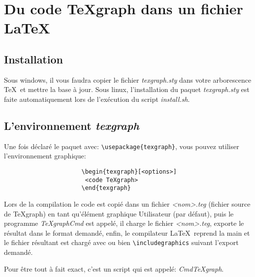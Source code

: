 \chapter[Du code TeXgraph dans LaTeX]{Du code TeXgraph dans un fichier LaTeX}\label{chapcodeindoc}

\renewcommand*{\opt}[2]{\textcolor{\coloropt}{#1 = < #2 >}\ifhtml\else\index{#1~(option)}\fi}

\section{Installation}

Sous windows, il vous faudra copier le fichier \textit{texgraph.sty} dans votre arborescence \TeX\ et mettre la base à jour. Sous linux, l'installation du paquet \textit{texgraph.sty} est faite automatiquement lors de l'exécution du script \textit{install.sh}.

\medskip



\section{L'environnement \textit{texgraph}}

Une fois déclaré le paquet avec: \verb|\usepackage{texgraph}|, vous pouvez utiliser l'environnement graphique:
\begin{verbatim}
                      \begin{texgraph}[<options>]
                       <code TeXgraph>
                      \end{texgraph}
\end{verbatim}

Lors de la compilation le code est copié dans un fichier \textit{<nom>.teg} (fichier source de TeXgraph) en tant qu'élément graphique Utilisateur (par défaut), puis le programme \textit{TeXgraphCmd} est appelé, il charge le fichier \textit{<nom>.teg}, exporte le résultat dans le format demandé, enfin, le compilateur \LaTeX\ reprend la main et le fichier résultant est chargé avec \verb|| ou bien \verb|\includegraphics| suivant l'export demandé.

Pour être tout à fait exact, c'est un script qui est appelé: \textit{CmdTeXgraph}.

\medskip

